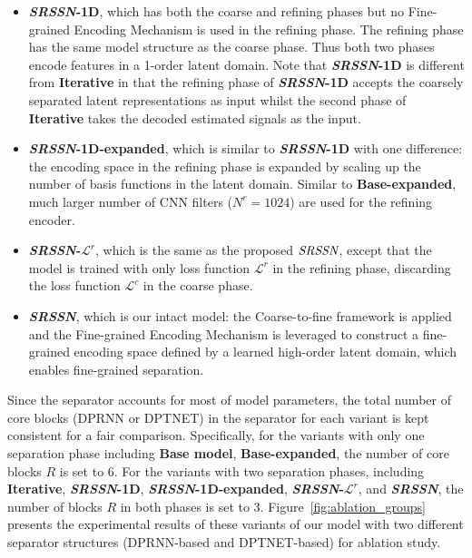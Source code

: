 \begin{itemize}
    \item \textbf{\emph{SRSSN}-1D}, which has both the coarse and refining phases but no Fine-grained Encoding Mechanism is used in the refining phase. The refining phase has the same model structure as the coarse phase. Thus both two phases encode features in a 1-order latent domain. Note that \textbf{\emph{SRSSN}-1D} is different from \textbf{Iterative} in that the refining phase of \textbf{\emph{SRSSN}-1D} accepts the coarsely separated latent representations as input whilst the second phase of \textbf{Iterative} takes the decoded estimated signals as the input.
    \item \textbf{\emph{SRSSN}-1D-expanded}, which is similar to \textbf{\emph{SRSSN}-1D} with one difference: the encoding space in the refining phase is expanded by scaling up the number of basis functions in the latent domain. Similar to \textbf{Base-expanded}, much larger number of CNN filters ($N^r=1024$) are used for the refining encoder.
\item \textbf{\emph{SRSSN}-$\mathcal{L}^r$}, which is the same as the proposed $\emph{SRSSN}$, except that the model is trained with only loss function $\mathcal{L}^r$ in the refining phase, discarding the loss function $\mathcal{L}^c$ in the coarse phase. 
    \item \textbf{\emph{SRSSN}}, which is our intact model: the Coarse-to-fine framework is applied and the Fine-grained Encoding Mechanism is leveraged to construct a fine-grained encoding space defined by a learned high-order latent domain, which enables fine-grained separation.
\end{itemize}
Since the separator accounts for most of model parameters, the total number of core blocks (DPRNN or DPTNET) in the separator for each variant is kept consistent for a fair comparison. Specifically, for the variants with only one separation phase including \textbf{Base model}, \textbf{Base-expanded},  the number of core blocks $R$ is set to 6. For the variants with two separation phases, including \textbf{Iterative}, \textbf{\emph{SRSSN}-1D}, \textbf{\emph{SRSSN}-1D-expanded}, \textbf{\emph{SRSSN}-$\mathcal{L}^r$}, and \textbf{\emph{SRSSN}}, the number of blocks $R$ in both phases is set to 3. Figure~\ref{fig:ablation_groups} presents the experimental results of these  variants of our model with two different separator structures (DPRNN-based and DPTNET-based) for ablation study.




